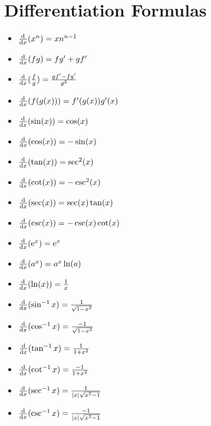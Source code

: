 \documentclass[letterpaper, 12pt]{math}
\begin{document}
\section{Differentiation Formulas}
\begin{itemize}
  \item \( \frac{\mathrm{d}}{\mathrm{d}{x}}(x^{n}) = xn^{n-1} \)
  \item \( \frac{\mathrm{d}}{\mathrm{d}{x}}(fg) = fg' + gf' \)
  \item \( \frac{\mathrm{d}}{\mathrm{d}{x}}(\frac{f}{g}) = \frac{gf'-fg'}{g^{2}} \)
  \item \( \frac{\mathrm{d}}{\mathrm{d}{x}}(f(g(x))) = f'(g(x))g'(x) \)
  \item \( \frac{\mathrm{d}}{\mathrm{d}{x}}(\sin(x)) = \cos(x) \)
  \item \( \frac{\mathrm{d}}{\mathrm{d}{x}}(\cos(x)) = -\sin(x) \)
  \item \( \frac{\mathrm{d}}{\mathrm{d}{x}}(\tan(x)) = \sec^{2}(x) \)
  \item \( \frac{\mathrm{d}}{\mathrm{d}{x}}(\cot(x)) = -\csc^{2}(x) \)
  \item \( \frac{\mathrm{d}}{\mathrm{d}{x}}(\sec(x)) = \sec(x)\tan(x) \)
  \item \( \frac{\mathrm{d}}{\mathrm{d}{x}}(\csc(x)) = -\csc(x)\cot(x) \)
  \item \( \frac{\mathrm{d}}{\mathrm{d}{x}}(\mathrm{e}^{x}) = \mathrm{e}^{x} \)
  \item \( \frac{\mathrm{d}}{\mathrm{d}{x}}(a^{x}) = a^{x}\ln(a) \)
  \item \( \frac{\mathrm{d}}{\mathrm{d}{x}}(\ln(x)) = \frac{1}{x} \)
  \item \( \frac{\mathrm{d}}{\mathrm{d}{x}}(\sin^{-1}{x}) = \frac{1}{\sqrt{1-x^{2}}} \)
  \item \( \frac{\mathrm{d}}{\mathrm{d}{x}}(\cos^{-1}{x}) =
           \frac{-1}{\sqrt{1-x^{2}}} \)
  \item \( \frac{\mathrm{d}}{\mathrm{d}{x}}(\tan^{-1}{x}) = \frac{1}{1+x^{2}} \)
  \item \( \frac{\mathrm{d}}{\mathrm{d}{x}}(\cot^{-1}{x}) = \frac{-1}{1+x^{2}} \)
  \item \( \frac{\mathrm{d}}{\mathrm{d}{x}}(\sec^{-1}{x}) = \frac{1}{|x|\sqrt{x^{2}-1}} \)
  \item \( \frac{\mathrm{d}}{\mathrm{d}{x}}(\csc^{-1}{x}) = \frac{-1}{|x|\sqrt{x^{2}-1}} \)
\end{itemize}
\end{document}
